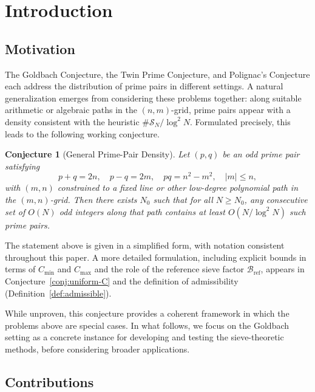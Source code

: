 \documentclass[11pt]{article}
\theoremstyle{inline}
\theoremstyle{break}
\theoremstyle{break}
\theoremstyle{break}
\newtheorem{conjecture}{Conjecture}
\theoremstyle{break}
\theoremstyle{break}
\theoremstyle{inline}
\newcommand{\tref}{{\scriptscriptstyle\mathrm{ref}}}
\newcommand{\Cmeas}{C}              %
\newcommand{\Bref}{\mathcal{B}_\tref}
\begin{document}

\section*{Introduction}

\subsection*{Motivation}
The Goldbach Conjecture, the Twin Prime Conjecture, and Polignac’s Conjecture each address the distribution of prime pairs in different settings.  
A natural generalization emerges from considering these problems together: along suitable arithmetic or algebraic paths in the \( (n,m) \)-grid, prime pairs appear with a density consistent with the heuristic \( \#\mathcal{S}_N / \log^2 N \).  
Formulated precisely, this leads to the following working conjecture.

\begin{conjecture}[General Prime-Pair Density]
Let \( (p,q) \) be an odd prime pair satisfying
\begin{equation}
p+q = 2n,\quad p-q = 2m,\quad pq = n^2 - m^2,\quad |m| \le n,
\end{equation}
with \( (m,n) \) constrained to a fixed line or other low-degree polynomial path in the \( (m,n) \)-grid.  
Then there exists \( N_0 \) such that for all \( N \ge N_0 \), any consecutive set of \( O(N) \) odd integers along that path contains at least \( O(N / \log^2 N) \) such prime pairs.
\end{conjecture}

The statement above is given in a simplified form, with notation consistent throughout this paper.  
A more detailed formulation, including explicit bounds in terms of \( \Cmeas_{\min} \) and \( \Cmeas_{\max} \) and the role of the reference sieve factor \( \Bref \), appears in Conjecture~\ref{conj:uniform-C} and the definition of admissibility (Definition~\ref{def:admissible}).

While unproven, this conjecture provides a coherent framework in which the problems above are special cases.  
In what follows, we focus on the Goldbach setting as a concrete instance for developing and testing the sieve-theoretic methods,  
before considering broader applications.


\subsection*{Contributions}
\end{document}
